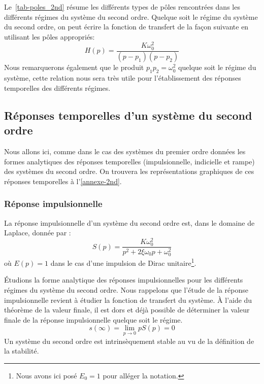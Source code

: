 Le~\cref{tab-poles_2nd} résume les différents types de pôles rencontrées dans 
les différents régimes du système du second ordre.
Quelque soit le régime du système du second ordre, on peut écrire la fonction 
de transfert de la façon suivante en utilisant les pôles appropriés:
\[
H(p)=\dfrac{K\omega^2_0}{(p-p_1)(p-p_2)}
\]
Nous remarquerons également que le produit $p_1p_2=\omega^2_0$ quelque soit 
le régime du système, cette relation nous sera très utile pour 
l'établissement des réponses temporelles des différents régimes.
\subsection{Réponses temporelles d'un système du second ordre}
Nous allons ici, comme dans le cas des systèmes du premier ordre données 
les formes analytiques des réponses temporelles (impulsionnelle, indicielle 
et rampe) des systèmes du second ordre. On trouvera les représentations 
graphiques de ces réponses temporelles à l'\cref{annexe-2nd}.
\subsubsection{Réponse impulsionnelle}
La réponse impulsionnelle d'un système du second ordre est, dans le domaine 
de Laplace, donnée par :
\[
S(p)=\dfrac{K\omega_0^2}{p^2+2\xi\omega_0p+\omega_0^2}
\]
où $E(p)=1$ dans le cas d'une impulsion de Dirac unitaire\footnote{Nous avons 
ici posé $E_0=1$ pour alléger la notation.}.

\'Etudions la forme analytique des réponses impulsionnelles pour les 
différents régimes du système du second ordre. Nous rappelons que l'étude 
de la réponse impulsionnelle revient à étudier la fonction de 
transfert du système. 
\`A l'aide du théorème de la valeur finale, 
il est dors et déjà possible de déterminer la valeur finale de la réponse
impulsionnelle quelque soit le régime.
\[
s(\infty)=\lim\limits_{p\to 0} pS(p) = 0
\]
Un système du second ordre est intrinsèquement stable au vu de 
la définition de la stabilité.
